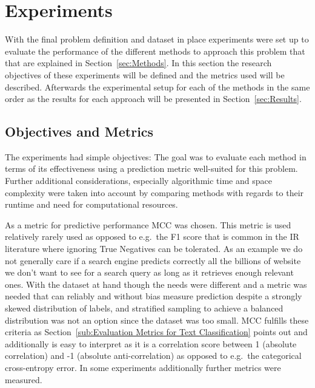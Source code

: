 
\thispagestyle{empty}

\section{Experiments}
\label{sec:Experiments}


With the final problem definition and dataset in place experiments were set up to evaluate the performance of the different methods to approach this problem that that are explained in Section~\ref{sec:Methods}. In this section the research objectives of these experiments will be defined and the metrics used will be described. Afterwards the experimental setup for each of the methods in the same order as the results for each approach will be presented in Section~\ref{sec:Results}.

\subsection{Objectives and Metrics}
\label{sub:Objectives and Metrics}

The experiments had simple objectives: The goal was to evaluate each method in terms of its effectiveness using a prediction metric well-suited for this problem. Further additional considerations, especially algorithmic time and space complexity were taken into account by comparing methods with regards to their runtime and need for computational resources.


As a metric for predictive performance \gls{MCC} was chosen. This metric is used relatively rarely used as opposed to e.g.\ the F1 score that is common in the \gls{IR} literature where ignoring True Negatives can be tolerated. As an example we do not generally care if a search engine predicts correctly all the billions of website we don't want to see for a search query as long as it retrieves enough relevant ones.
With the dataset at hand though the needs were different and a metric was needed that can reliably and without bias measure prediction despite a strongly skewed distribution of labels, and stratified sampling to achieve a balanced distribution was not an option since the dataset was too small. \gls{MCC} fulfills these criteria as Section~\ref{sub:Evaluation Metrics for Text Classification} points out and additionally is easy to interpret as it is a correlation score between 1 (absolute correlation) and -1 (absolute anti-correlation) as opposed to e.g.\ the categorical cross-entropy error. In some experiments additionally further metrics were measured.

